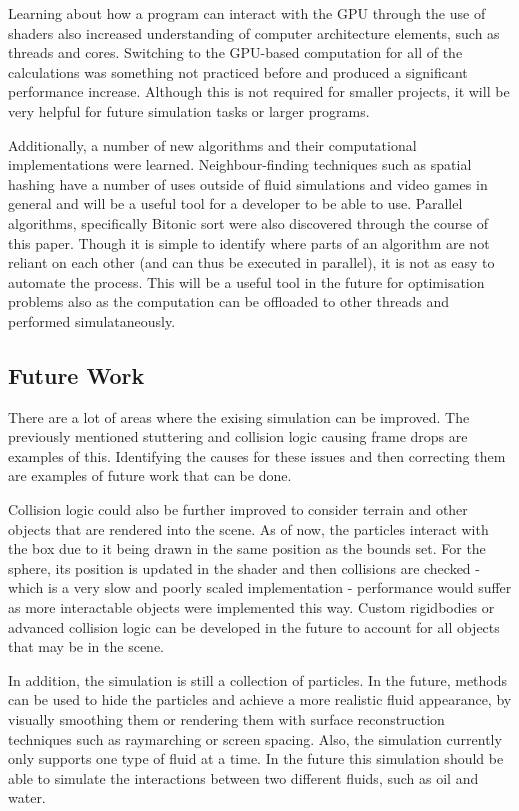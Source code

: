 \documentclass[12pt]{article}
\begin{document}
    Learning about how a program can interact with the GPU through the use of shaders also increased understanding of computer architecture elements, such as threads and cores. Switching to the GPU-based computation for all of the calculations was something not practiced before and produced a significant performance increase. Although this is not required for smaller projects, it will be very helpful for future simulation tasks or larger programs.
    
    Additionally, a number of new algorithms and their computational implementations were learned. Neighbour-finding techniques such as spatial hashing have a number of uses outside of fluid simulations and video games in general and will be a useful tool for a developer to be able to use. Parallel algorithms, specifically Bitonic sort were also discovered through the course of this paper. Though it is simple to identify where parts of an algorithm are not reliant on each other (and can thus be executed in parallel), it is not as easy to automate the process. This will be a useful tool in the future for optimisation problems also as the computation can be offloaded to other threads and performed simulataneously.

    \subsection{Future Work}

    There are a lot of areas where the exising simulation can be improved. The previously mentioned stuttering and collision logic causing frame drops are examples of this. Identifying the causes for these issues and then correcting them are examples of future work that can be done.
    
    Collision logic could also be further improved to consider terrain and other objects that are rendered into the scene. As of now, the particles interact with the box due to it being drawn in the same position as the bounds set. For the sphere, its position is updated in the shader and then collisions are checked - which is a very slow and poorly scaled implementation - performance would suffer as more interactable objects were implemented this way. Custom rigidbodies or advanced collision logic can be developed in the future to account for all objects that may be in the scene.

    In addition, the simulation is still a collection of particles. In the future, methods can be used to hide the particles and achieve a more realistic fluid appearance, by visually smoothing them or rendering them with surface reconstruction techniques such as raymarching or screen spacing. Also, the simulation currently only supports one type of fluid at a time. In the future this simulation should be able to simulate the interactions between two different fluids, such as oil and water.
    
\end{document}
